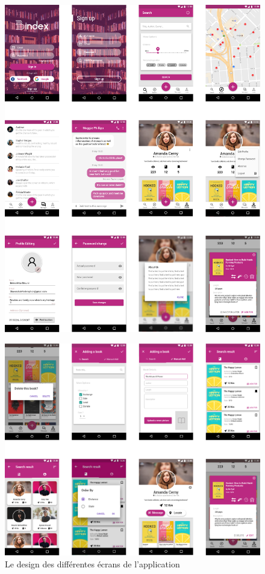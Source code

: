 \begin{figure}[H]
	\centering
		\includegraphics[width=14cm]{Images/chapter3/ui-design_1.png}
\end{figure}

\begin{figure}[H]
	\centering
		\includegraphics[width=14cm]{Images/chapter3/ui-design_2.png}
		\caption{{\footnotesize Le design des différentes écrans de l'application}}
\end{figure}

